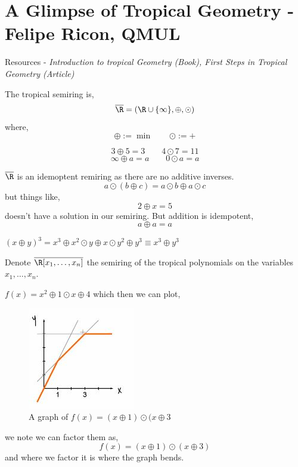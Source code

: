 \documentclass{article}
\begin{document}
\section{A Glimpse of Tropical Geometry - Felipe Ricon, QMUL}

Resources - \textit{Introduction to tropical Geometry (Book), First Steps in Tropical Geometry (Article)}

\begin{ndefi}
  The tropical semiring is,
  $$ \overline{\R} = (\R \cup \{\infty\}, \oplus, \odot) $$
  where,
  $$ \oplus := \min \qquad \odot := + $$
\end{ndefi}

\begin{eg}
  $$ 3 \oplus 5 = 3 \qquad 4 \odot 7 = 11 $$
  $$ \infty \oplus a = a \qquad 0 \odot a = a $$
\end{eg}


$\overline \R$ is an idemoptent remiring as there are no additive inverses.
$$ a \odot (b \oplus c) = a \odot b \oplus a \odot c $$
but things like,
$$ 2 \oplus x = 5 $$
doesn't have a solution in our semiring. But addition is idempotent,
$$ a \oplus a  = a $$
\begin{eg}
  $(x \oplus y)^3 = x^3 \oplus x^2 \odot y \oplus x \odot y^2 \oplus y^3 \equiv x^3\oplus y^3$
\end{eg}

\noindent
Denote $\overline \R [x_1, \dots, x_n]$ the semiring of the tropical polynomials on the variables $x_1, \dots, x_n$.

\begin{eg}
  $f(x) = x^2 \oplus 1 \odot x \oplus 4$
  which then we can plot,
  \begin{figure}[!ht]
  \centering
  \includegraphics{./figures/L2.1}
  \caption{A graph of $f(x) = (x \oplus 1)\odot (x \oplus 3$}
  \end{figure}

  we note we can factor them as,
  $$ f(x) = (x \oplus 1)\odot (x \oplus 3) $$
  and where we factor it is where the graph bends.
\end{eg}
\end{document}

